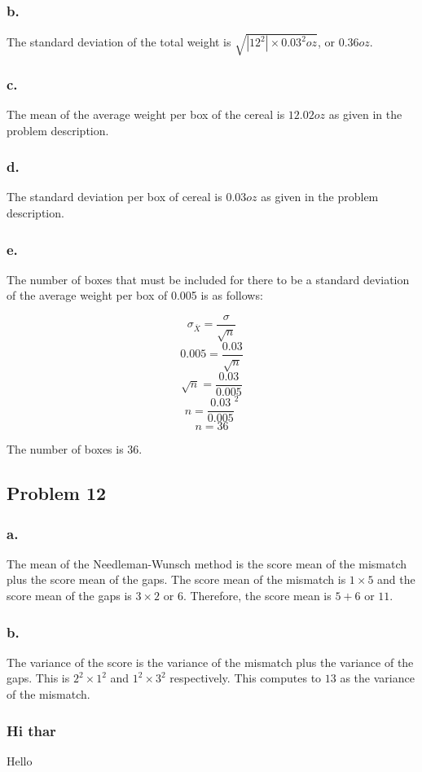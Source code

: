 \documentclass[11pt]{article}
\begin{document}
\subsubsection*{b.}
The standard deviation of the total weight is $\sqrt{|12^2|\times 0.03^2 oz}$, or $0.36 oz$.

\subsubsection*{c.}
The mean of the average weight per box of the cereal is $12.02 oz$ as given in the
problem description.

\subsubsection*{d.}
The standard deviation per box of cereal is $0.03 oz$ as given in the problem
description. 

\subsubsection*{e.}
The number of boxes that must be included for there to be a standard deviation
of the average weight per box of 0.005 is as follows:

\[ \sigma_{\overline{X}} = \frac{\sigma}{\sqrt{n}} \]
\[ 0.005 = \frac{0.03}{\sqrt{n}} \]
\[ \sqrt{n} = \frac{0.03}{0.005} \]
\[ n = \frac{0.03}{0.005}^2 \]
\[ n = 36 \]

The number of boxes is 36.


\subsection*{Problem 12}
\subsubsection*{a.}
The mean of the Needleman-Wunsch method is the score mean of the mismatch plus the
score mean of the gaps. The score mean of the mismatch is $1\times 5$ and the
score mean of the
gaps is $3 \times 2$ or $6$. Therefore, the score mean is $5 + 6$ or $11$. 

\subsubsection*{b.}
The variance of the score is the variance of the mismatch plus the variance of
the gaps. This is $2^2\times 1^2$ and $1^2\times 3^2$ respectively. This
computes to $13$ as the variance of the mismatch. 


\subsubsection{Hi thar}

Hello
\end{document}
